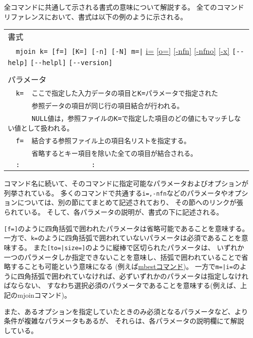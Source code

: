 %

全コマンドに共通して示される書式の意味について解説する。
全てのコマンドリファレンスにおいて、書式は以下の例のように示される。

\begin{table}[htbp]
\begin{center}
\begin{tabular}{l}
\hline
{\large 書式} \\
\verb/  mjoin k= [f=] [K=] [-n] [-N] m=|/ 
\hyperref[sect:option_i]{i=}
\hyperref[sect:option_o]{[o=]}
\hyperref[sect:option_nfn]{[-nfn]} 
\hyperref[sect:option_nfno]{[-nfno]}  
\hyperref[sect:option_x]{[-x]}
\verb|[--help]|
\verb|[--helpl]|
\verb|[--version]|\\

\\
{\large パラメータ} \\
\verb|  k=  ここで指定した入力データの項目とK=パラメータで指定された|\\
\verb|      参照データの項目が同じ行の項目結合が行われる。|\\
\verb|      NULL値は，参照ファイルのK=で指定した項目のどの値にもマッチしない値として扱われる。|\\
\verb|  f=  結合する参照ファイル上の項目名リストを指定する。|\\
\verb|      省略するとキー項目を除いた全ての項目が結合される。|\\
\verb|  :                  :|\\
\hline
\end{tabular} 
\end{center}
\end{table} 

コマンド名に続いて、そのコマンドに指定可能なパラメータおよびオプションが列挙されている。
多くのコマンドで共通する\verb|i=,-nfn|などのパラメータやオプションについては、別の節にてまとめて記述されており、
その節へのリンクが張られている。
そして、各パラメータの説明が、書式の下に記述される。

\verb|[f=]|のように四角括弧で囲われたパラメータは省略可能であることを意味する。
一方で、\verb|k=|のように四角括弧で囲われていないパラメータは必須であることを意味する。
また\verb/[to=|size=]/のように縦棒で区切られたパラメータは、
いずれか一つのパラメータしか指定できないことを意味し、括弧で囲われていることで省略することも可能という意味になる
(例えば\hyperref[sect:mbest]{mbestコマンド})。
一方で\verb/m=|i=/のように四角括弧で囲われていなければ、必ずいずれかのパラメータは指定しなければならない、
すなわち選択必須のパラメータであることを意味する(例えば、上記のmjoinコマンド)。

また、あるオプションを指定していたときのみ必須となるパラメータなど、より条件が複雑なパラメータもあるが、
それらは、各パラメータの説明欄にて解説している。

%
